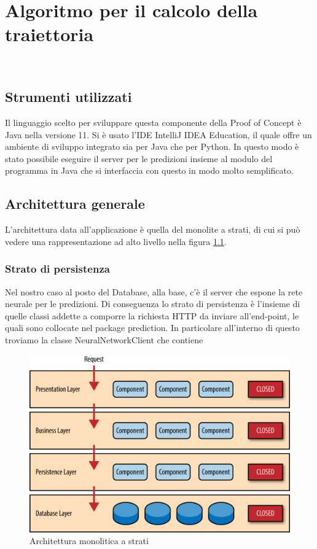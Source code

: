 
\chapter{Algoritmo per il calcolo della traiettoria}
\label{cap:business-logic}

\\


\section{Strumenti utilizzati}
Il linguaggio scelto per sviluppare questa componente della Proof of Concept è Java nella versione 11. Si è usato l'IDE IntelliJ IDEA Education, il quale offre un ambiente di sviluppo integrato sia per Java che per Python. In questo modo è stato possibile eseguire il server per le predizioni insieme al modulo del programma in Java che si interfaccia con questo in modo molto semplificato.

\section{Architettura generale}
L'architettura data all'applicazione è quella del monolite a strati, di cui si può vedere una rappresentazione ad alto livello nella figura \ref{fig:layered_architecture}.

\subsection{Strato di persistenza}
Nel nostro caso al posto del Database, alla base, c'è il server che espone la rete neurale per le predizioni. Di conseguenza lo strato di persistenza è l'insieme di quelle classi addette a comporre la richiesta HTTP da inviare all'end-point, le quali sono collocate nel package prediction. In particolare all'interno di questo troviamo la classe NeuralNetworkClient che contiene

\begin{figure}
    \centering
    \includegraphics[width=\textwidth]{immagini/layered_archiecture.png}
    \caption{Architettura monolitica a strati}
    \label{fig:layered_architecture}
\end{figure}
